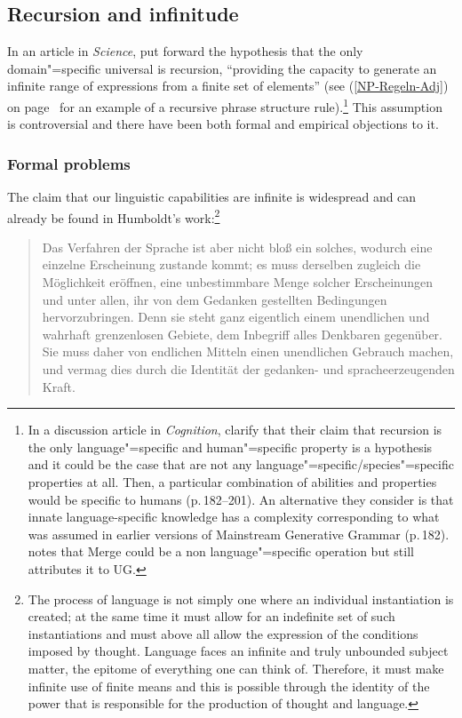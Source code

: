 \subsection{Recursion and infinitude}
\label{Abschnitt-Rekursion}

In an article in \emph{Science}, \citet*{HCF2002a} put forward the hypothesis that the only
domain"=specific universal is recursion, ``providing the capacity to generate an infinite range of expressions from a finite set of elements'' (see (\ref{NP-Regeln-Adj}) on page~\pageref{NP-Regeln-Adj} for an example of a
recursive phrase structure rule).\footnote{
	In a discussion article in \emph{Cognition}, \citet*{FHC2005a} clarify that their claim that recursion is the only language"=specific and
	human"=specific property is a hypothesis and it could be the case that are not any language"=specific/species"=specific properties at all.
	Then, a particular combination of abilities and properties would be specific to humans
        (p.\,182--201). An alternative they consider is that innate language-specific knowledge has a complexity corresponding to what was assumed in earlier versions of Mainstream Generative Grammar (p.\,182).
%
\citet[]{Chomsky2007a} notes that Merge could be a non language"=specific operation but still attributes it to UG.%
} This assumption is controversial and there have been both formal and empirical objections to it.

\subsubsection{Formal problems}

The claim that our linguistic capabilities are infinite is widespread and can already be found
in Humboldt's work:\footnote{
The process of language is not simply one where an individual instantiation is created; at the same time it must allow for an
indefinite set of such instantiations and must above all allow the expression of the conditions imposed by thought.
Language faces an infinite and truly unbounded subject matter, the epitome of everything one can think of. Therefore, it must make
infinite use of finite means and this is possible through the identity of the power that is
responsible for the production of thought and language.
}
\begin{quote}
Das Verfahren der Sprache ist aber nicht bloß ein solches, wodurch eine einzelne Erscheinung zustande kommt;
es muss derselben zugleich die Möglichkeit eröffnen, eine unbestimmbare Menge solcher Erscheinungen und unter allen,
ihr von dem Gedanken gestellten Bedingungen hervorzubringen.
Denn sie steht ganz eigentlich einem unendlichen und wahrhaft grenzenlosen Gebiete, dem Inbegriff alles
Denk\-baren gegenüber. Sie muss daher von endlichen Mitteln einen unendlichen Gebrauch machen, und
vermag dies durch die Identität der gedanken- und sprache\-erzeugenden Kraft.  \citep[]{Humboldt88a-u}
\end{quote}

